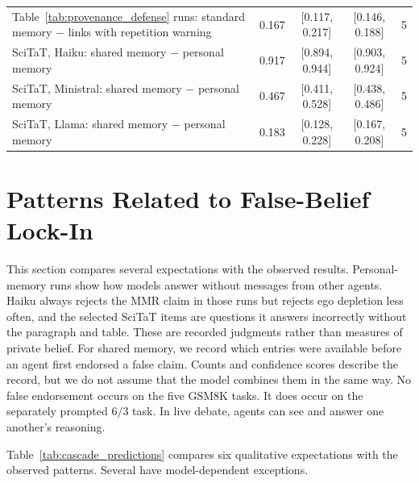 \begin{table}[htbp]
\begin{center}
\begin{tabular}{lcccc}
\shortstack[l]{Table~\ref{tab:provenance_defense} runs:\\standard memory $-$ links with repetition warning} & 0.167 & [0.117, 0.217] & [0.146, 0.188] & 5 \\
\shortstack[l]{SciTaT, Haiku:\\shared memory $-$ personal memory} & 0.917 & [0.894, 0.944] & [0.903, 0.924] & 5 \\
\shortstack[l]{SciTaT, Ministral:\\shared memory $-$ personal memory} & 0.467 & [0.411, 0.528] & [0.438, 0.486] & 5 \\
\shortstack[l]{SciTaT, Llama:\\shared memory $-$ personal memory} & 0.183 & [0.128, 0.228] & [0.167, 0.208] & 5 \\
\bottomrule
\end{tabular}
\end{center}
\end{table}

\section{Patterns Related to False-Belief Lock-In}
\label{app:lockin_patterns}

This section compares several expectations with the observed results. Personal-memory runs show how models answer without messages from other agents. Haiku always rejects the MMR claim in those runs but rejects ego depletion less often, and the selected SciTaT items are questions it answers incorrectly without the paragraph and table. These are recorded judgments rather than measures of private belief. For shared memory, we record which entries were available before an agent first endorsed a false claim. Counts and confidence scores describe the record, but we do not assume that the model combines them in the same way. No false endorsement occurs on the five GSM8K tasks. It does occur on the separately prompted $6/3$ task. In live debate, agents can see and answer one another's reasoning.

Table~\ref{tab:cascade_predictions} compares six qualitative expectations with the observed patterns. Several have model-dependent exceptions.

